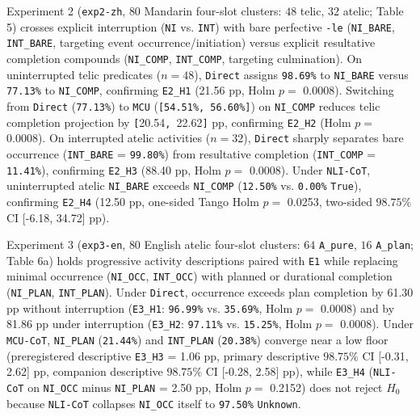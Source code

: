\documentclass[11pt,a4paper]{article}
\begin{document}
Experiment 2 (\texttt{exp2-\allowbreak{}zh}, $80$ Mandarin four-slot clusters: $48$ telic, $32$ atelic; Table 5) crosses explicit interruption (\texttt{NI} vs. \texttt{INT}) with bare perfective \texttt{-\allowbreak{}le} (\texttt{NI\_\allowbreak{}BARE}, \texttt{INT\_\allowbreak{}BARE}, targeting event occurrence/initiation) versus explicit resultative completion compounds (\texttt{NI\_\allowbreak{}COMP}, \texttt{INT\_\allowbreak{}COMP}, targeting culmination). On uninterrupted telic predicates ($n=48$), \texttt{Direct} assigns \texttt{98.69\%} to \texttt{NI\_\allowbreak{}BARE} versus \texttt{77.13\%} to \texttt{NI\_\allowbreak{}COMP}, confirming \texttt{E2\_\allowbreak{}H1} (21.56 pp, Holm $p=$ 0.0008). Switching from \texttt{Direct} (\texttt{77.13\%}) to \texttt{MCU} (\texttt{[54.51\%, 56.60\%]}) on \texttt{NI\_\allowbreak{}COMP} reduces telic completion projection by \texttt{[}20.54\texttt{, }22.62\texttt{]} pp, confirming \texttt{E2\_\allowbreak{}H2} (Holm $p=$ 0.0008). On interrupted atelic activities ($n=32$), \texttt{Direct} sharply separates bare occurrence (\texttt{INT\_\allowbreak{}BARE} = \texttt{99.80\%}) from resultative completion (\texttt{INT\_\allowbreak{}COMP} = \texttt{11.41\%}), confirming \texttt{E2\_\allowbreak{}H3} (88.40 pp, Holm $p=$ 0.0008). Under \texttt{NLI-\allowbreak{}CoT}, uninterrupted atelic \texttt{NI\_\allowbreak{}BARE} exceeds \texttt{NI\_\allowbreak{}COMP} (\texttt{12.50\%} vs. \texttt{0.00\%} \texttt{True}), confirming \texttt{E2\_\allowbreak{}H4} (12.50 pp, one-sided Tango Holm $p=$ 0.0253, two-sided $98.75\%$ CI [-6.18, 34.72] pp).

Experiment 3 (\texttt{exp3-\allowbreak{}en}, $80$ English atelic four-slot clusters: $64$ \texttt{A\_\allowbreak{}pure}, $16$ \texttt{A\_\allowbreak{}plan}; Table 6a) holds progressive activity descriptions paired with \texttt{E1} while replacing minimal occurrence (\texttt{NI\_\allowbreak{}OCC}, \texttt{INT\_\allowbreak{}OCC}) with planned or durational completion (\texttt{NI\_\allowbreak{}PLAN}, \texttt{INT\_\allowbreak{}PLAN}). Under \texttt{Direct}, occurrence exceeds plan completion by 61.30 pp without interruption (\texttt{E3\_\allowbreak{}H1}: \texttt{96.99\%} vs. \texttt{35.69\%}, Holm $p=$ 0.0008) and by 81.86 pp under interruption (\texttt{E3\_\allowbreak{}H2}: \texttt{97.11\%} vs. \texttt{15.25\%}, Holm $p=$ 0.0008). Under \texttt{MCU-\allowbreak{}CoT}, \texttt{NI\_\allowbreak{}PLAN} (\texttt{21.44\%}) and \texttt{INT\_\allowbreak{}PLAN} (\texttt{20.38\%}) converge near a low floor (preregistered descriptive \texttt{E3\_\allowbreak{}H3} = 1.06 pp, primary descriptive $98.75\%$ CI [-0.31, 2.62] pp, companion descriptive $98.75\%$ CI [-0.28, 2.58] pp), while \texttt{E3\_\allowbreak{}H4} (\texttt{NLI-\allowbreak{}CoT} on \texttt{NI\_\allowbreak{}OCC} minus \texttt{NI\_\allowbreak{}PLAN} = 2.50 pp, Holm $p=$ 0.2152) does not reject $H_0$ because \texttt{NLI-\allowbreak{}CoT} collapses \texttt{NI\_\allowbreak{}OCC} itself to \texttt{97.50\%} \texttt{Unknown}.
\end{document}
